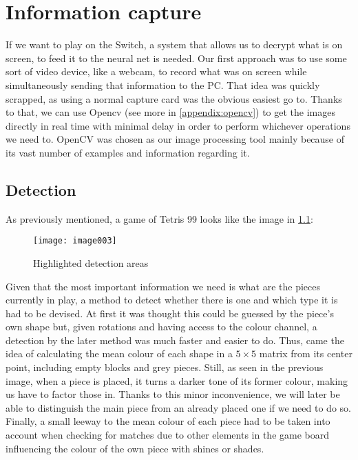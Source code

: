 
\chapter{Information capture}
If we want to play on the Switch, a system that allows us to decrypt what is on screen, to feed it to the neural net is needed. Our first approach was to use some sort of video device, like a webcam, to record what was on screen while simultaneously sending that information to the \ac{PC}. That idea was quickly scrapped, as using a normal capture card was the obvious easiest go to. Thanks to that, we can use Opencv (see more in \ref{appendix:opencv}) to get the images directly in real time with minimal delay in order to perform whichever operations we need to. OpenCV was chosen as our image processing tool mainly because of its vast number of examples and information regarding it.

\section{Detection}
As previously mentioned, a game of Tetris 99 looks like the image in \ref{fig:highlighted}:
 
\begin{figure}[h]
\centering
\texttt{[image: image003]}
\caption{\label{fig:highlighted}Highlighted detection areas}
\end{figure}

Given that the most important information we need is what are the pieces currently in play, a method to detect whether there is one and which type it is had to be devised. At first it was thought this could be guessed by the piece’s own shape but, given rotations and having access to the colour channel, a detection by the later method was much faster and easier to do. Thus, came the idea of calculating the mean colour of each shape in a $5\times 5$ matrix from its center point, including empty blocks and grey pieces. Still, as seen in the previous image, when a piece is placed, it turns a darker tone of its former colour, making us have to factor those in. Thanks to this minor inconvenience, we will later be able to distinguish the main piece from an already placed one if we need to do so. Finally, a small leeway to the mean colour of each piece had to be taken into account when checking for matches due to other elements in the game board influencing the colour of the own piece with shines or shades.

